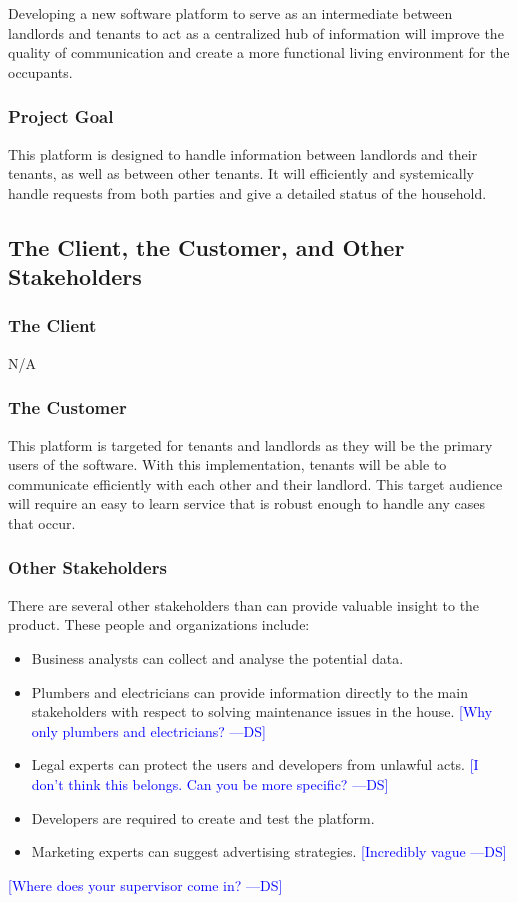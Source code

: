 \documentclass[12pt, titlepage]{article}
\newcommand{\authornote}[3]{\textcolor{#1}{[#3 ---#2]}}
\newcommand{\authornote}[3]{}
\newcommand{\ds}[1]{\authornote{blue}{DS}{#1}}
\begin{document}
\noindent Developing a new software platform to serve as an intermediate between 
landlords and tenants to act as a centralized hub of information will improve 
the quality of communication and create a more functional living environment 
for the occupants.

\subsubsection{Project Goal}
This platform is designed to handle information between landlords and their 
tenants, as well as between other tenants. It will efficiently and systemically 
handle requests from both parties and give a detailed status of the household.

\subsection{The Client, the Customer, and Other Stakeholders}
\subsubsection {The Client}
  N/A 
\subsubsection {The Customer}
This platform is targeted for tenants and landlords as they will be the 
primary users of the software. With this implementation, tenants will be 
able to communicate efficiently with each other and their landlord. This target 
audience will require an easy to learn service that is robust enough to handle 
any cases that occur.
\subsubsection {Other Stakeholders}
There are several other stakeholders than can provide valuable insight 
to the product. These people and organizations include:
\begin{itemize}
\item Business analysts can collect and analyse the potential data.
\item Plumbers and electricians can provide information directly to the main 
stakeholders with respect to 
solving maintenance issues in the house.
\ds{Why only plumbers and electricians?}
\item Legal experts can protect the users and developers from unlawful acts.
\ds{I don't think this belongs. Can you be more specific?}
\item Developers are required to create and test the platform.
\item Marketing experts can suggest advertising strategies. 
\ds{Incredibly vague}
\end{itemize}
\ds{Where does your supervisor come in?}
\end{document}
